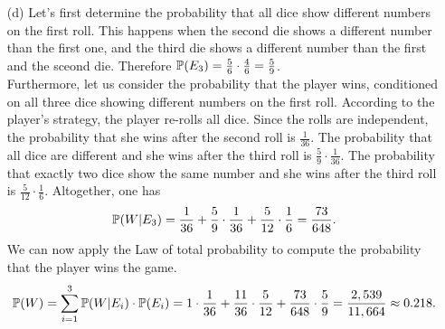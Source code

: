 \begin{enumerate}
  \item[(d)] Let's first determine the probability that all dice show different
    numbers on the first roll. This happens when the second die shows a different
    number than the first one, and the third die shows a different number than the
    first and the sceond die. Therefore $\mathbb{P}(E_3) = \frac{5}{6} \cdot \frac{4}{6}
    = \frac{5}{9}$. \\
    Furthermore, let us consider the probability that the player wins, conditioned
    on all three dice showing different numbers on the first roll. According to the
    player's strategy, the player re-rolls all dice. Since the rolls are independent,
    the probability that she wins after the second roll is $\frac{1}{36}$. The
    probability that all dice are different and she wins after the third roll is
    $\frac{5}{9} \cdot \frac{1}{36}$. The probability that exactly two dice show the
    same number and she wins after the third roll is $\frac{5}{12} \cdot \frac{1}{6}$.  Altogether, one has
    \[ \mathbb{P}(W|E_3)
        = \frac{1}{36} + \frac{5}{9} \cdot \frac{1}{36} +
          \frac{5}{12} \cdot \frac{1}{6}
        = \frac{73}{648}.
    \]
    We can now apply the Law of total probability to compute the probability that
    the player wins the game.
    \[
      \mathbb{P}(W)
        = \sum_{i=1}^3 \mathbb{P}(W|E_i) \cdot \mathbb{P}(E_i)
        = 1 \cdot \frac{1}{36} + \frac{11}{36} \cdot \frac{5}{12} + \frac{73}{648} \cdot \frac{5}{9}
        = \frac{2,539}{11,664}
        \approx 0.218.
    \]
\end{enumerate}
